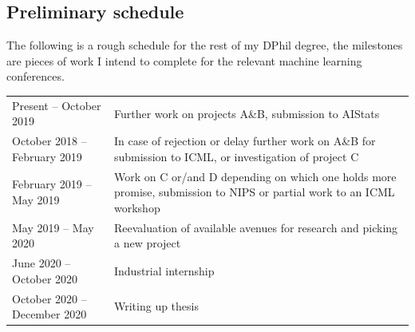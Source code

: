 \documentclass[12pt]{article}
\begin{document}
\newpage
\subsection{Preliminary schedule}
The following is a rough schedule for the rest of my DPhil degree, the milestones are pieces of work I intend to complete for the relevant machine learning conferences.

\begin{table}[h!]
\begin{tabular}{lp{11cm}}
Present -- October 2019         & Further work on projects A\&B, submission to AIStats \\
October 2018 -- February 2019   & In case of rejection or delay further work on A\&B for submission to ICML, or investigation of project C \\
February 2019 -- May 2019       & Work on C or/and D depending on which one holds more promise, submission to NIPS or partial work to an ICML workshop \\
May 2019 -- May 2020            & Reevaluation of available avenues for research and picking a new project \\
June 2020 -- October 2020       & Industrial internship \\
October 2020 -- December 2020   & Writing up thesis
\end{tabular}
\end{table}

\newpage 

 



% 
\end{document}
